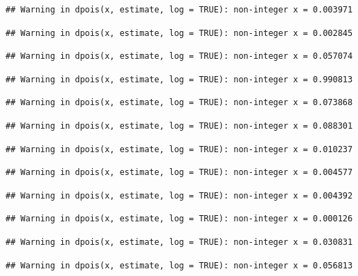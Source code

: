 \documentclass[]{article}
\begin{document}
\begin{verbatim}
## Warning in dpois(x, estimate, log = TRUE): non-integer x = 0.003971
\end{verbatim}

\begin{verbatim}
## Warning in dpois(x, estimate, log = TRUE): non-integer x = 0.002845
\end{verbatim}

\begin{verbatim}
## Warning in dpois(x, estimate, log = TRUE): non-integer x = 0.057074
\end{verbatim}

\begin{verbatim}
## Warning in dpois(x, estimate, log = TRUE): non-integer x = 0.990813
\end{verbatim}

\begin{verbatim}
## Warning in dpois(x, estimate, log = TRUE): non-integer x = 0.073868
\end{verbatim}

\begin{verbatim}
## Warning in dpois(x, estimate, log = TRUE): non-integer x = 0.088301
\end{verbatim}

\begin{verbatim}
## Warning in dpois(x, estimate, log = TRUE): non-integer x = 0.010237
\end{verbatim}

\begin{verbatim}
## Warning in dpois(x, estimate, log = TRUE): non-integer x = 0.004577
\end{verbatim}

\begin{verbatim}
## Warning in dpois(x, estimate, log = TRUE): non-integer x = 0.004392
\end{verbatim}

\begin{verbatim}
## Warning in dpois(x, estimate, log = TRUE): non-integer x = 0.000126
\end{verbatim}

\begin{verbatim}
## Warning in dpois(x, estimate, log = TRUE): non-integer x = 0.030831
\end{verbatim}

\begin{verbatim}
## Warning in dpois(x, estimate, log = TRUE): non-integer x = 0.056813
\end{verbatim}
\end{document}
